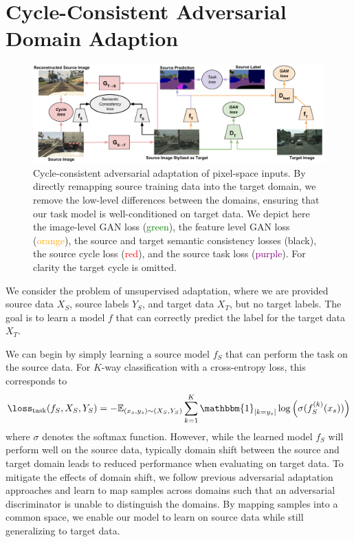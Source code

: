 
\section{Cycle-Consistent Adversarial Domain Adaption}

\begin{figure}
  \includegraphics[width=\textwidth]{figs/cycada_method_src_colored.pdf}
  \caption{
    Cycle-consistent adversarial adaptation of pixel-space inputs.
    By directly remapping source training data into the target domain, we remove the low-level differences between the domains, ensuring that our task model is well-conditioned on target data. We depict here the image-level GAN loss (\textcolor{green}{green}), the feature level GAN loss (\textcolor{orange}{orange}), the source and target semantic consistency losses (black), the source cycle loss (\textcolor{red}{red}), and the source task loss (\textcolor{purple}{purple}). For clarity the target cycle is omitted. 
  }
  \label{fig:implementation}
\end{figure}

We consider the problem of unsupervised adaptation, where we are provided source data $X_S$, source labels $Y_S$, and target data $X_T$, but no target labels.
The goal is to learn a model $f$ that can correctly predict the label for the target data $X_T$.

We can begin by simply learning a source model $f_S$ that can perform the task on the source data.
For $K$-way classification with a cross-entropy loss, this corresponds to
\begin{align}
  \loss_{\text{task}}(f_S, X_S, Y_S) = 
  		- \mathbb{E}_{\small{(x_s, y_s) \sim (X_S, Y_S)} }
        \sum_{k=1}^K \mathbbm{1}_{[k = y_s]} \log \left( \sigma(f_S^{(k)}(x_s)) \right) 
\end{align}
where $\sigma$ denotes the softmax function. 
However, while the learned model $f_S$ will perform well on the source data, typically domain shift between the source and target domain leads to reduced performance when evaluating on target data.
To mitigate the effects of domain shift, we follow previous adversarial adaptation approaches and learn to map samples across domains such that an adversarial discriminator is unable to distinguish the domains.
By mapping samples into a common space, we enable our model to learn on source data while still generalizing to target data.

